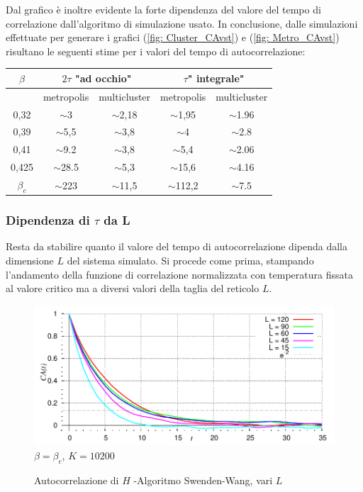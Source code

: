 Dal grafico è inoltre evidente la forte dipendenza del valore del tempo di correlazione dall'algoritmo di simulazione usato.
\medskip
In conclusione, dalle simulazioni effettuate per generare i grafici (\ref{fig: Cluster_CAvst}) e (\ref{fig: Metro_CAvst}) risultano le seguenti stime per i valori del tempo di autocorrelazione:
\begin{center}
\begin{tabular}{ | c| c c| c c|} 
\hline
$\beta$		& \multicolumn{2}{|c|}{$2\tau$ "ad occhio" } & \multicolumn{2}{|c|}{$\tau$" integrale" } \\
\hline 
	  & metropolis & multicluster & metropolis & multicluster \\
 0,32 & $\sim$3    & $\sim$2,18   & $\sim$1,95 & $\sim$1.96   \\
 0,39 & $\sim$5,5    & $\sim$3,8   & $\sim$4 & $\sim$2.8   \\
 0,41 & $\sim$9.2    & $\sim$3,8   & $\sim$5,4 & $\sim$2.06   \\
 0,425& $\sim$28.5    & $\sim$5,3   & $\sim$15,6 & $\sim$4.16   \\
 $\beta_c$ & $\sim$223    & $\sim$11,5   & $\sim$112,2 & $\sim$7.5   \\
 \hline 
\end{tabular}
\end{center}



\subsubsection*{Dipendenza di $\tau$ da L}
Resta da stabilire quanto il valore del tempo di autocorrelazione dipenda dalla dimensione $L$ del sistema simulato.
Si procede come prima, stampando l'andamento della funzione di correlazione normalizzata con temperatura fissata al valore critico ma a diversi valori della taglia del reticolo $L$.

\begin{figure}[!h]
\centering
\caption[ParteB$\_$Tc$\_$TauvsN$\_$Cluster.cpp]{Autocorrelazione di $H$ -\footnotesize  Algoritmo Swenden-Wang, vari $L$}\label{fig: Cluster_Tc_CAvst}
\includegraphics[scale=0.75]{Immagini/ParteB/Cluster_Tc_CAvst}
\newline \footnotesize $\beta = \beta_c$, $K = 10200$
\end{figure}

